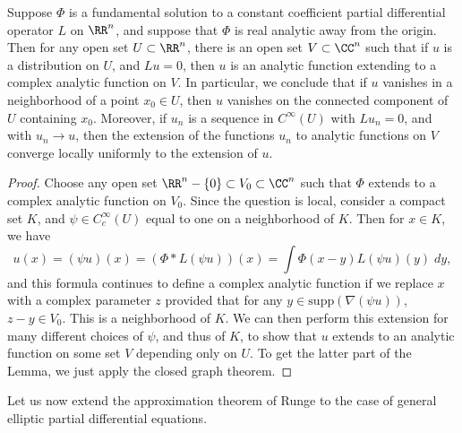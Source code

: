 \begin{lemma}
    Suppose $\Phi$ is a fundamental solution to a constant coefficient partial differential operator $L$ on $\RR^n$, and suppose that $\Phi$ is real analytic away from the origin. Then for any open set $U \subset \RR^n$, there is an open set $V \subset \CC^n$ such that if $u$ is a distribution on $U$, and $Lu = 0$, then $u$ is an analytic function extending to a complex analytic function on $V$. In particular, we conclude that if $u$ vanishes in a neighborhood of a point $x_0 \in U$, then $u$ vanishes on the connected component of $U$ containing $x_0$. Moreover, if $u_n$ is a sequence in $C^\infty(U)$ with $Lu_n = 0$, and with $u_n \to u$, then the extension of the functions $u_n$ to analytic functions on $V$ converge locally uniformly to the extension of $u$.
\end{lemma}
\begin{proof}
    Choose any open set $\RR^n - \{ 0 \} \subset V_0 \subset \CC^n$ such that $\Phi$ extends to a complex analytic function on $V_0$. Since the question is local, consider a compact set $K$, and $\psi \in C_c^\infty(U)$ equal to one on a neighborhood of $K$. Then for $x \in K$, we have
    \[ u(x) = (\psi u)(x) = (\Phi * L(\psi u))(x) = \int \Phi(x-y) L(\psi u)(y)\; dy, \]
    and this formula continues to define a complex analytic function if we replace $x$ with a complex parameter $z$ provided that for any $y \in \text{supp}(\nabla (\psi u))$, $z - y \in V_0$. This is a neighborhood of $K$. We can then perform this extension for many different choices of $\psi$, and thus of $K$, to show that $u$ extends to an analytic function on some set $V$ depending only on $U$. To get the latter part of the Lemma, we just apply the closed graph theorem.
\end{proof}

Let us now extend the approximation theorem of Runge to the case of general elliptic partial differential equations.

